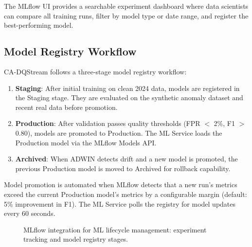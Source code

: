The MLflow UI provides a searchable experiment dashboard where data scientists can compare all training runs, filter by model type or date range, and register the best-performing model.

\subsection{Model Registry Workflow}

CA-DQStream follows a three-stage model registry workflow:

\begin{enumerate}
    \item \textbf{Staging}: After initial training on clean 2024 data, models are registered in the Staging stage. They are evaluated on the synthetic anomaly dataset and recent real data before promotion.
    \item \textbf{Production}: After validation passes quality thresholds (FPR $<$ 2\%, F1 $>$ 0.80), models are promoted to Production. The ML Service loads the Production model via the MLflow Models API.
    \item \textbf{Archived}: When ADWIN detects drift and a new model is promoted, the previous Production model is moved to Archived for rollback capability.
\end{enumerate}

Model promotion is automated when MLflow detects that a new run's metrics exceed the current Production model's metrics by a configurable margin (default: 5\% improvement in F1). The ML Service polls the registry for model updates every 60 seconds.

\begin{figure}[H]
\centering
{}
\caption{MLflow integration for ML lifecycle management: experiment tracking and model registry stages.}
\end{figure}

